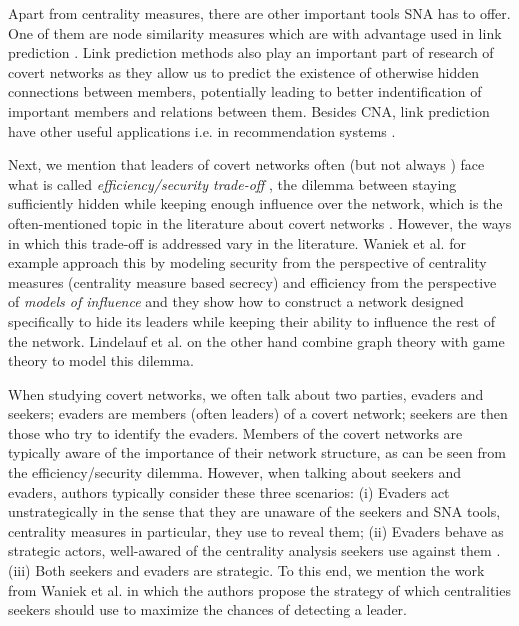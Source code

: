 Apart from centrality measures, there are other important tools SNA has to offer.
One of them are node similarity measures which are with advantage used in link prediction \cite{Zhou2009,Wang2014}.
Link prediction methods also play an important part of research of covert networks
as they allow us to predict the existence of otherwise hidden connections between members, potentially leading to
better indentification of important members and relations between them.
Besides CNA, link prediction have other useful applications i.e. in recommendation systems \cite{Huang2005,Talasu2017}.

Next, we mention that leaders of covert networks often (but not always \cite{Fatih2012}) face what is called
\emph{efficiency/security trade-off} \cite{Morselli2007},
the dilemma between staying sufficiently hidden while keeping enough influence over the network,
which is the often-mentioned topic in the literature about covert networks \cite{Crossley2012,Waniek2017,Lindelauf2009}.
However, the ways in which this trade-off is addressed vary in the literature.
Waniek et al. \cite{Waniek2017} for example approach this by modeling security from the perspective of
centrality measures (centrality measure based secrecy) and efficiency from the perspective of \emph{models of influence}
and they show how to construct a network designed specifically to hide its leaders while
keeping their ability to influence the rest of the network.
Lindelauf et al. \cite{Lindelauf2009} on the other hand combine graph theory with game theory to model this dilemma.

When studying covert networks, we often talk about two parties, evaders and seekers;
evaders are members (often leaders) of a covert network;
seekers are then those who try to identify the evaders.
Members of the covert networks are typically aware of the importance of their network structure, as can be seen from
the efficiency/security dilemma.
However, when talking about seekers and evaders, authors typically consider these three scenarios:
(i) Evaders act unstrategically in the sense that they are unaware of
the seekers and SNA tools, centrality measures in particular, they use to reveal them;
(ii) Evaders behave as strategic actors, well-awared of the centrality analysis seekers use against them \cite{Waniek2017,Dey2019,Dey2020}.
(iii) Both seekers and evaders are strategic.
To this end, we mention the work from Waniek et al. \cite[y.~2021]{Waniek2021} in which the authors propose
the strategy of which centralities seekers should use to maximize the chances of detecting
a leader.

